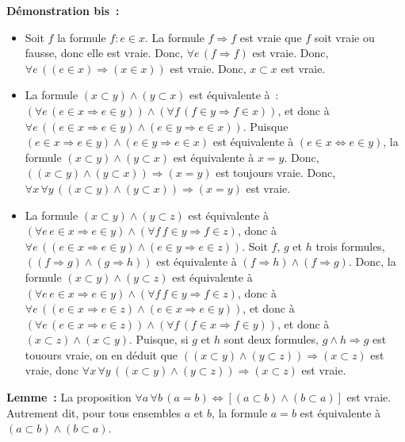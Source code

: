 \noindent \textbf{Démonstration bis :} 
\begin{itemize}[nosep]
    \item Soit $f$ la formule $f: e \in x$. 
        La formule $f \Rightarrow f$ est vraie que $f$ soit vraie ou fausse, donc elle est vraie. 
        Donc, $\forall e \, (f \Rightarrow f)$ est vraie.
        Donc, $\forall e \, ((e \in x) \Rightarrow (x \in x))$ est vraie. 
        Donc, $x \subset x$ est vraie. 
    \item La formule $(x \subset y) \wedge (y \subset x)$ est équivalente à : $(\forall e \, (e \in x \Rightarrow e \in y)) \wedge (\forall f \, (f \in y \Rightarrow f \in x))$, et donc à $\forall e \, ((e \in x \Rightarrow e \in y) \wedge (e \in y \Rightarrow e \in x))$. 
        Puisque $(e \in x \Rightarrow e \in y) \wedge (e \in y \Rightarrow e \in x)$ est équivalente à $(e \in x \Leftrightarrow e \in y)$, la formule $(x \subset y) \wedge (y \subset x)$ est équivalente à $x = y$.
        Donc, $((x \subset y) \wedge (y \subset x)) \Rightarrow (x = y)$ est toujours vraie. 
        Donc, $\forall x \, \forall y \, ((x \subset y) \wedge (y \subset x)) \Rightarrow (x = y)$ est vraie. 
    \item La formule $(x \subset y) \wedge (y \subset z)$ est équivalente à $(\forall e \, e \in x \Rightarrow e \in y) \wedge (\forall f \, f \in y \Rightarrow f \in z)$, donc à $\forall e \, ((e \in x \Rightarrow e \in y) \wedge (e \in y \Rightarrow e \in z))$. 
        Soit $f$, $g$ et $h$ trois formules, $((f \Rightarrow g) \wedge (g \Rightarrow h))$ est équivalente à $(f \Rightarrow h) \wedge (f \Rightarrow g)$.
        Donc, la formule $(x \subset y) \wedge (y \subset z)$ est équivalente à $(\forall e \, e \in x \Rightarrow e \in y) \wedge (\forall f \, f \in y \Rightarrow f \in z)$, donc à $\forall e \, ((e \in x \Rightarrow e \in z) \wedge (e \in x \Rightarrow e \in y))$, et donc à $(\forall e \, (e \in x \Rightarrow e \in z)) \wedge (\forall f \, (f \in x \Rightarrow f \in y))$, et donc à $(x \subset z) \wedge (x \subset y)$. 
        Puisque, si $g$ et $h$ sont deux formules, $g \wedge h \Rightarrow g$ est touours vraie, on en déduit que $((x \subset y) \wedge (y \subset z)) \Rightarrow (x \subset z)$ est vraie, donc $\forall x \, \forall y \, ((x \subset y) \wedge (y \subset z)) \Rightarrow (x \subset z)$ est vraie.
\end{itemize}

\done

\medskip

\noindent\textbf{Lemme :} La proposition $\forall a \, \forall b \, (a = b) \Leftrightarrow [(a \subset b) \wedge (b \subset a)]$ est vraie.
    Autrement dit, pour tous ensembles $a$ et $b$, la formule $a = b$ est équivalente à $(a \subset b) \wedge (b \subset a)$.

